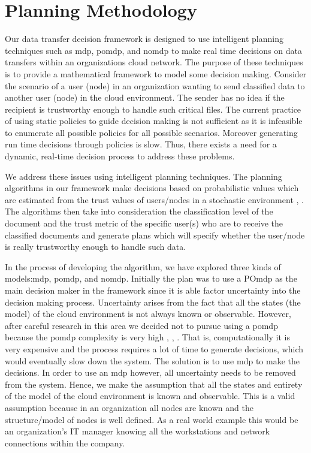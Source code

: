 \section{Planning Methodology}
Our data transfer decision framework is designed to use intelligent planning
techniques such as \gls{mdp}, \gls{pomdp}, and \gls{nomdp} to
make real time decisions on data transfers within an organizations cloud
network. The purpose of these techniques is to provide a mathematical framework
to model some decision making. Consider the scenario of a user (node) in an
organization wanting to send classified data to another user (node) in the cloud
environment. The sender has no idea if the recipient is trustworthy enough to
handle such critical files. The current practice of using static policies to
guide decision making is not sufficient as it is infeasible to enumerate all
possible policies for all possible scenarios. Moreover generating run time
decisions through policies is slow. Thus, there exists a need for a dynamic,
real-time decision process to address these problems. 

We address these issues using intelligent planning techniques. The planning
algorithms in our framework make decisions based on probabilistic values which
are estimated from the trust values of users/nodes in a stochastic environment
\autocite{JMarecki2012}, \autocite{JWu.2011}. The algorithms then take into consideration the classification level
of the document and the trust metric of the specific user(s) who are to receive
the classified documents and generate plans which will specify whether the
user/node is really trustworthy enough to handle such data.  

In the process of
developing the algorithm, we have explored three kinds of models:\gls{mdp},
\gls{pomdp}, and \gls{nomdp}. Initially the plan was to use a PO\gls{mdp} as the 
main decision maker in the
framework since it is able factor uncertainty into the decision making process.
Uncertainty arises from the fact that all the states (the model) of the cloud
environment is not always known or observable. However, after careful research
in this area we decided not to pursue using a \gls{pomdp} because the
\gls{pomdp} complexity
is very high \autocite{LeslieP.Kaelbling1998}, \autocite{Zilberman},
\autocite{DongNguyen2009}. 
That is, computationally it is very expensive and the
process requires a lot of time to generate decisions, which would eventually
slow down the system. The solution is to use \gls{mdp} to make the decisions. In order
to use an \gls{mdp} however, all uncertainty needs to be removed from the system.
Hence, we make the assumption that all the states and entirety of the model of
the cloud environment is known and observable. This is a valid assumption
because in an organization all nodes are known and the structure/model of nodes
is well defined. As a real world example this would be an organization's IT
manager knowing all the workstations and network connections within the company.

